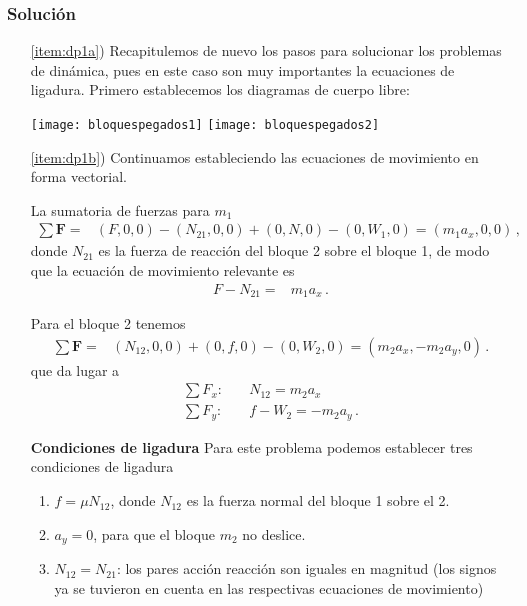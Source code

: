 \subsubsection*{Solución}
\begin{frame}
\begin{itemize}
  \item[\ref{item:dp1a})] Recapitulemos de nuevo los pasos para solucionar los problemas de dinámica, pues en este caso son muy importantes la ecuaciones de ligadura. Primero establecemos los diagramas de cuerpo libre:
 
\texttt{[image: bloquespegados1]} \texttt{[image: bloquespegados2]}

  \item[\ref{item:dp1b})] Continuamos estableciendo las ecuaciones de movimiento en forma vectorial.  


La sumatoria de fuerzas para $m_1$
    \begin{align*}
    \sum \mathbf{F}=&(F,0,0)-(N_{21},0,0)+(0,N,0)-(0,W_1,0)=(m_1 a_x,0,0)\,,  
    \end{align*}
    donde $N_{21}$ es la fuerza de reacción del bloque 2 sobre el bloque 1, de modo que la ecuación de movimiento relevante es
    \begin{align}
      \label{eq:dp1}
      F-N_{21}=&m_1 a_x\,.
    \end{align}

    Para el bloque 2 tenemos
    \begin{align*}
    \sum \mathbf{F}=&(N_{12},0,0)+(0,f,0)-(0,W_2,0)=(m_2a_x,-m_2 a_y,0)\,. 
    \end{align*}
    que da lugar a
    \begin{align}
      \label{eq:dp2}
      \sum F_x:\quad&N_{12}=m_2 a_x\nonumber\\
      \sum F_y:\quad&f-W_2=-m_2 a_y\,.
    \end{align}

    \textbf{Condiciones de ligadura}
    Para este problema podemos establecer tres condiciones de ligadura
    \begin{enumerate}
    \item $f=\mu N_{12}$, donde $N_{12}$ es la fuerza normal del bloque 1 sobre el 2.
    \item $a_y=0$, para que el bloque $m_2$ no deslice.
    \item $N_{12}=N_{21}$: los pares acción reacción son iguales en magnitud (los signos ya se tuvieron en cuenta en las respectivas ecuaciones de movimiento)
    \end{enumerate}


\end{itemize}
\end{frame}
